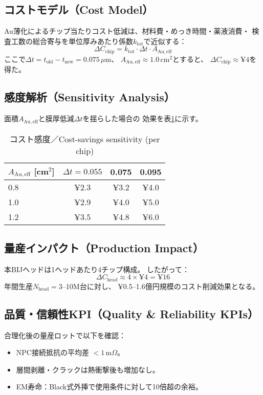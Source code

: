 \documentclass[conference]{IEEEtran}
\begin{document}
\subsection{コストモデル（Cost Model）}
Au薄化によるチップ当たりコスト低減は、材料費・めっき時間・薬液消費・
検査工数の総合寄与を単位厚みあたり係数$k_{\mathrm{tot}}$で近似する：
\begin{equation}
  \Delta C_{\mathrm{chip}}
   = k_{\mathrm{tot}}\cdot \Delta t \cdot A_{\mathrm{Au,eff}}
\end{equation}
ここで$\Delta t=t_{\mathrm{old}}-t_{\mathrm{new}}=0.075\,\mu$m、
$A_{\mathrm{Au,eff}}\approx 1.0\,\mathrm{cm^2}$とすると、
$\Delta C_{\mathrm{chip}}\approx ¥4$を得た。

\subsection{感度解析（Sensitivity Analysis）}
面積$A_{\mathrm{Au,eff}}$と膜厚低減$\Delta t$を揺らした場合の
効果を表\ref{tab:cost-sense}に示す。

\begin{table}[htbp]
  \centering
  \caption{コスト感度／Cost-savings sensitivity (per chip)}
  \label{tab:cost-sense}
  \begin{tabular}{@{}lccc@{}}
    \toprule
    $A_{\mathrm{Au,eff}}$ [cm$^2$] & $\Delta t=0.055$ & 0.075 & 0.095 \\
    \midrule
    0.8 & ¥2.3 & ¥3.2 & ¥4.0 \\
    1.0 & ¥2.9 & ¥4.0 & ¥5.0 \\
    1.2 & ¥3.5 & ¥4.8 & ¥6.0 \\
    \bottomrule
  \end{tabular}
\end{table}

\subsection{量産インパクト（Production Impact）}
本BIJヘッドは1ヘッドあたり4チップ構成。
したがって：
\[
 \Delta C_{\mathrm{head}} \approx 4 \times ¥4 = ¥16
\]
年間生産$N_{\mathrm{head}}=3$--10M台に対し、
¥0.5--1.6億円規模のコスト削減効果となる。

\subsection{品質・信頼性KPI（Quality \& Reliability KPIs）}
合理化後の量産ロットで以下を確認：
\begin{itemize}
  \item NPC接続抵抗の平均差 $<1$\,m$\Omega$。
  \item 層間剥離・クラックは熱衝撃後も増加なし。
  \item EM寿命：Black式外挿で使用条件に対して10倍超の余裕。
\end{itemize}
\end{document}
